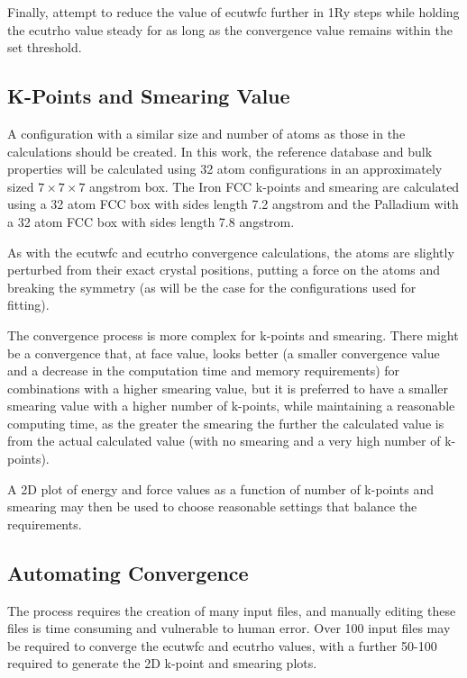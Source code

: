 Finally, attempt to reduce the value of ecutwfc further in 1Ry steps while holding the ecutrho value steady for as long as the convergence value remains within the set threshold.

\subsection{K-Points and Smearing Value}

A configuration with a similar size and number of atoms as those in the calculations should be created.  In this work, the reference database and bulk properties will be calculated using 32 atom configurations in an approximately sized $7 \times 7 \times 7$ angstrom box.  The Iron FCC k-points and smearing are calculated using a 32 atom FCC box with sides length 7.2 angstrom and the Palladium with a 32 atom FCC box with sides length 7.8 angstrom.

As with the ecutwfc and ecutrho convergence calculations, the atoms are slightly perturbed from their exact crystal positions, putting a force on the atoms and breaking the symmetry (as will be the case for the configurations used for fitting). 

The convergence process is more complex for k-points and smearing.  There might be a convergence that, at face value, looks better (a smaller convergence value and a decrease in the computation time and memory requirements) for combinations with a higher smearing value, but it is preferred to have a smaller smearing value with a higher number of k-points, while maintaining a reasonable computing time, as the greater the smearing the further the calculated value is from the actual calculated value (with no smearing and a very high number of k-points).

A 2D plot of energy and force values as a function of number of k-points and smearing may then be used to choose reasonable settings that balance the requirements.


\subsection{Automating Convergence}

The process requires the creation of many input files, and manually editing these files is time consuming and vulnerable to human error. Over 100 input files may be required to converge the ecutwfc and ecutrho values, with a further 50-100 required to generate the 2D k-point and smearing plots.

